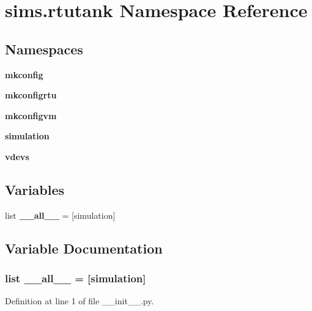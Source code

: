 \section{sims.\+rtutank Namespace Reference}
\label{namespacesims_1_1rtutank}
\subsection*{Namespaces}
\begin{DoxyCompactItemize}
\item 
 {\bf mkconfig}
\item 
 {\bf mkconfigrtu}
\item 
 {\bf mkconfigvm}
\item 
 {\bf simulation}
\item 
 {\bf vdevs}
\end{DoxyCompactItemize}
\subsection*{Variables}
\begin{DoxyCompactItemize}
\item 
list {\bf \+\_\+\+\_\+all\+\_\+\+\_\+} = [\textquotesingle{}simulation\textquotesingle{}]
\end{DoxyCompactItemize}


\subsection{Variable Documentation}
\subsubsection[{\+\_\+\+\_\+all\+\_\+\+\_\+}]{\setlength{\rightskip}{0pt plus 5cm}list \+\_\+\+\_\+all\+\_\+\+\_\+ = [\textquotesingle{}simulation\textquotesingle{}]}\label{namespacesims_1_1rtutank_aa4a022e6ddacd362b83964da5cc5d044}


Definition at line 1 of file \+\_\+\+\_\+init\+\_\+\+\_\+.\+py.

